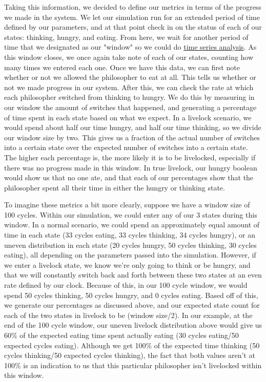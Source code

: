 \documentclass{article}
\begin{document}
Taking this information, we decided to define our metrics in terms of the progress we made in the system.  We let our simulation run 
for an extended period of time defined by our parameters, and at that point check in on the status of each of our states: thinking, 
hungry, and eating.  From here, we wait for another period of time that we designated as our "window" so we could do \href{https://en.wikipedia.org/wiki/Time_series}{time series analysis}. As this window closes, we once 
again take note of each of our states, counting how many times we entered each one.  Once we have this data, we can first note whether or not we allowed the philosopher to eat at all.  
This tells us whether or not we made progress in our system.  After this, we can check the rate at which each philosopher switched from 
thinking to hungry.  We do this by measuring in our window the amount of switches that happened, and generating a percentage of time spent 
in each state based on what we expect.  In a livelock scenario, we would spend about half our time hungry, and half our time thinking, so 
we divide our window size by two.  This gives us a fraction of the actual number of switches into a certain state over the expected number of 
switches into a certain state.  The higher each percentage is, the more likely it is to be livelocked, especially if there was no progress 
made in this window.  In true livelock, our hungry boolean would show us that no one ate, and that each of our percentages show that the 
philosopher spent all their time in either the hungry or thinking state. \newline

To imagine these metrics a bit more clearly, suppose we have a window size of 100 cycles.  Within our simulation, we could enter any of our 3 states during this window. In a normal scenario, we could spend an approximately equal amount of time in each state (33 cycles eating, 33 cycles thinking, 34 cycles hungry), or an uneven distribution in each state (20 cycles hungry, 50 cycles thinking, 30 cycles eating), all depending on the parameters passed into the simulation.  However, if we enter a livelock state, we know we're only going to think or be hungry, and that we will constantly switch back and forth between these two states at an even rate defined by our clock.  Because of this, in our 100 cycle window, we would spend 50 cycles thinking, 50 cycles hungry, and 0 cycles eating.  Based off of this, we generate our percentages as discussed above, and our expected state count for each of the two states in livelock to be (window size/2).  In our example, at the end of the 100 cycle window, our uneven livelock distribution above would give us 60\% of the expected eating time spent actually eating (30 cycles eating/50 expected cycles eating).  Although we get 100\% of the expected time thinking (50 cycles thinking/50 expected cycles thinking), the fact that both values aren't at 100\% is an indication to us that this particular philosopher isn't livelocked within this window. \newline
\end{document}
